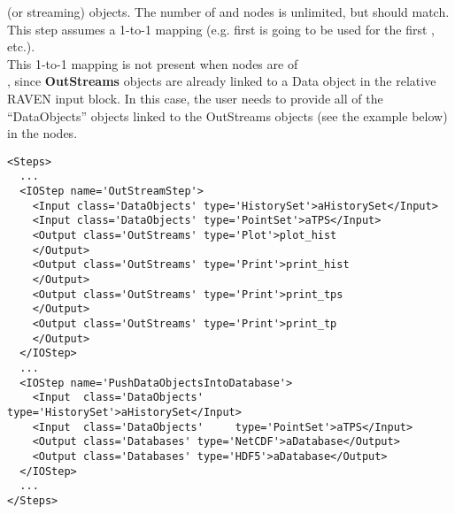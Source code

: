 (or streaming) objects.
%
The number of  and  nodes is unlimited, but
should match.
%
This step assumes a 1-to-1 mapping (e.g. first  is going to be
used for the first , etc.).
\\
\nb This 1-to-1 mapping is not present when  nodes are of
\\, since  \textbf{OutStreams}
objects are already linked to a Data object in the relative RAVEN input block.
%
In this case, the user needs to provide all of the
``DataObjects'' objects linked to the OutStreams objects (see the example
below) in the  nodes.
\begin{lstlisting}[style=XML,morekeywords={class}]
<Steps>
  ...
  <IOStep name='OutStreamStep'>
    <Input class='DataObjects' type='HistorySet'>aHistorySet</Input>
    <Input class='DataObjects' type='PointSet'>aTPS</Input>
    <Output class='OutStreams' type='Plot'>plot_hist
    </Output>
    <Output class='OutStreams' type='Print'>print_hist
    </Output>
    <Output class='OutStreams' type='Print'>print_tps
    </Output>
    <Output class='OutStreams' type='Print'>print_tp
    </Output>
  </IOStep>
  ...
  <IOStep name='PushDataObjectsIntoDatabase'>
    <Input  class='DataObjects'     type='HistorySet'>aHistorySet</Input>
    <Input  class='DataObjects'     type='PointSet'>aTPS</Input>
    <Output class='Databases' type='NetCDF'>aDatabase</Output>
    <Output class='Databases' type='HDF5'>aDatabase</Output>
  </IOStep>
  ...
</Steps>
\end{lstlisting}
%

